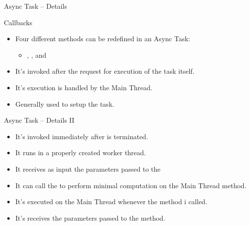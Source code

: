 \documentclass{beamer}
\begin{document}
  \begin{frame}[allowframebreaks]{Async Task -- Details}
    \begin{block}{Callbacks}
      \begin{itemize}
        \item Four different methods can be redefined in an Async Task:
        \begin{itemize}
          \item \small{, ,
           and }
        \end{itemize}
      \end{itemize}
    \end{block}

    \begin{block}{}
      \begin{itemize}
        \item It's invoked after the request for execution of the task itself. 
        \item It's execution is handled by the Main Thread.
        \item Generally used to setup the task.
      \end{itemize} 
    \end{block}
  \end{frame}

  \begin{frame}{Async Task -- Details II}
    \begin{block}{}
      \begin{itemize}
        \item It's invoked immediately after  is terminated.
        \item It runs in a properly created worker thread.
        \item It receives as input the parameters passed to the 
        \item It can call the  to perform minimal
        computation on the Main Thread  method.
      \end{itemize}
    \end{block}

    \begin{block}{}
      \begin{itemize}
        \item It's executed on the Main Thread whenever the
         method i called.
        \item It's receives the parameters passed to the  method.
      \end{itemize}
    \end{block}

  \end{frame}
\end{document}
